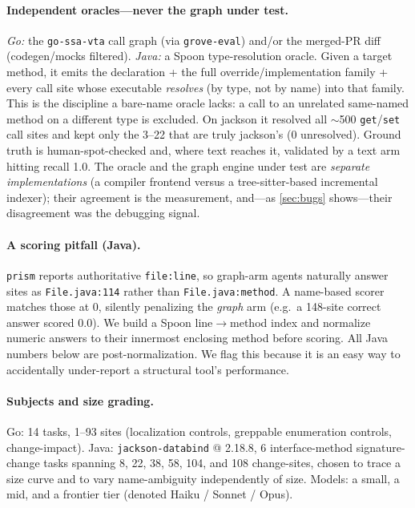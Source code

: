 \documentclass[11pt]{article}
\newcommand{\code}[1]{\texttt{#1}}
\begin{document}
\paragraph{Independent oracles---never the graph under test.}
\emph{Go:} the \code{go-ssa-vta} call graph (via \code{grove-eval}) and/or the
merged-PR diff (codegen/mocks filtered). \emph{Java:} a Spoon type-resolution
oracle. Given a target method, it emits the declaration + the full
override/implementation family + every call site whose executable \emph{resolves}
(by type, not by name) into that family. This is the discipline a bare-name
oracle lacks: a call to an unrelated same-named method on a different type is
excluded. On jackson it resolved all $\sim$500 \code{get}/\code{set} call sites
and kept only the 3--22 that are truly jackson's (0 unresolved). Ground truth is
human-spot-checked and, where text reaches it, validated by a text arm hitting
recall 1.0. The oracle and the graph engine under test are \emph{separate
implementations} (a compiler frontend versus a tree-sitter-based incremental
indexer); their agreement is the measurement, and---as \cref{sec:bugs}
shows---their disagreement was the debugging signal.

\paragraph{A scoring pitfall (Java).}
\code{prism} reports authoritative \code{file:line}, so graph-arm agents naturally
answer sites as \code{File.java:114} rather than \code{File.java:method}. A
name-based scorer matches those at 0, silently penalizing the \emph{graph} arm
(e.g.\ a 148-site correct answer scored 0.0). We build a Spoon
line$\rightarrow$method index and normalize numeric answers to their innermost
enclosing method before scoring. All Java numbers below are post-normalization.
We flag this because it is an easy way to accidentally under-report a structural
tool's performance.

\paragraph{Subjects and size grading.}
Go: 14 tasks, 1--93 sites (localization controls, greppable enumeration controls,
change-impact). Java: \code{jackson-databind} @ 2.18.8, 6 interface-method
signature-change tasks spanning 8, 22, 38, 58, 104, and 108 change-sites,
chosen to trace a size curve and to vary name-ambiguity independently of size.
Models: a small, a mid, and a frontier tier (denoted Haiku / Sonnet /
Opus).
\end{document}
